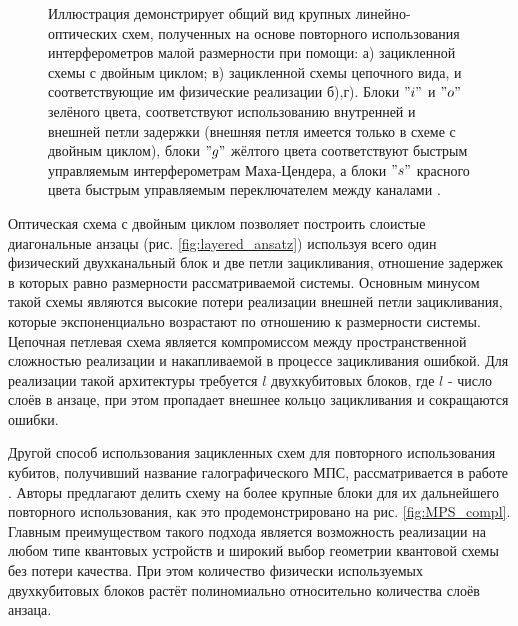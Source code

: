 \documentclass[14pt]{extarticle}
\begin{document}
\begin{figure}[H]
\begin{center}
\end{center}
\caption{ Иллюстрация демонстрирует общий вид крупных линейно-оптических схем, полученных на основе повторного использования интерферометров малой размерности при помощи: а) зацикленной схемы с двойным циклом; в) зацикленной схемы цепочного вида, и соответствующие им физические реализации б),г). Блоки $"i"$ и $"o"$ зелёного цвета, соответствуют использованию внутренней и внешней петли задержки (внешняя петля имеется только в схеме с двойным циклом), блоки $"g"$ жёлтого цвета соответствуют быстрым управляемым интерферометрам Маха-Цендера, а блоки $"s"$ красного цвета быстрым управляемым переключателем между каналами \cite{universal_linear_loop} .}\label{fig:loop_architectures}
\end{figure}


\qquad Оптическая схема с двойным циклом позволяет построить слоистые диагональные анзацы (рис. \ref{fig:layered_ansatz}) используя всего один физический двухканальный блок и две петли зацикливания, отношение задержек в которых равно размерности рассматриваемой системы. Основным минусом такой схемы являются высокие потери реализации внешней петли зацикливания, которые экспоненциально возрастают по отношению к размерности системы. Цепочная петлевая схема является компромиссом между пространственной сложностью реализации и накапливаемой в процессе зацикливания ошибкой. Для реализации такой архитектуры требуется $l$ двухкубитовых блоков, где $l$ - число слоёв в анзаце, при этом пропадает внешнее кольцо зацикливания и сокращаются ошибки.

\qquad Другой способ использования зацикленных схем для повторного использования кубитов, получивший название галографического МПС, рассматривается в работе \cite{Foss_Feig_2021}. Авторы предлагают делить схему на более крупные блоки для их дальнейшего повторного использования, как это продемонстрировано на рис. \ref{fig:MPS_compl}. Главным преимуществом такого подхода является возможность реализации на любом типе квантовых устройств и широкий выбор геометрии квантовой схемы без потери качества. При этом количество физически используемых двухкубитовых блоков растёт полиномиально относительно количества слоёв анзаца.
\end{document}
